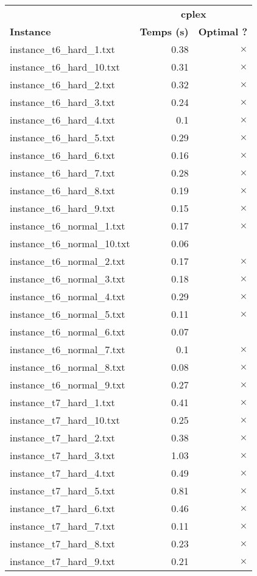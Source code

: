 \documentclass{article}
\begin{document}
\newpage
\begin{center}
\renewcommand{\arraystretch}{1.4} 
\begin{tabular}{lrr}
	\hline
 & \multicolumn{2}{c}{\textbf{cplex}}\\
\textbf{Instance}  & \textbf{Temps (s)} & \textbf{Optimal ?} \\\hline

instance\_t6\_hard\_1.txt & 0.38 & 
$\times$
\\
instance\_t6\_hard\_10.txt & 0.31 & 
$\times$
\\
instance\_t6\_hard\_2.txt & 0.32 & 
$\times$
\\
instance\_t6\_hard\_3.txt & 0.24 & 
$\times$
\\
instance\_t6\_hard\_4.txt & 0.1 & 
$\times$
\\
instance\_t6\_hard\_5.txt & 0.29 & 
$\times$
\\
instance\_t6\_hard\_6.txt & 0.16 & 
$\times$
\\
instance\_t6\_hard\_7.txt & 0.28 & 
$\times$
\\
instance\_t6\_hard\_8.txt & 0.19 & 
$\times$
\\
instance\_t6\_hard\_9.txt & 0.15 & 
$\times$
\\
instance\_t6\_normal\_1.txt & 0.17 & 
$\times$
\\
instance\_t6\_normal\_10.txt & 0.06 & 
\\
instance\_t6\_normal\_2.txt & 0.17 & 
$\times$
\\
instance\_t6\_normal\_3.txt & 0.18 & 
$\times$
\\
instance\_t6\_normal\_4.txt & 0.29 & 
$\times$
\\
instance\_t6\_normal\_5.txt & 0.11 & 
$\times$
\\
instance\_t6\_normal\_6.txt & 0.07 & 
\\
instance\_t6\_normal\_7.txt & 0.1 & 
$\times$
\\
instance\_t6\_normal\_8.txt & 0.08 & 
$\times$
\\
instance\_t6\_normal\_9.txt & 0.27 & 
$\times$
\\
instance\_t7\_hard\_1.txt & 0.41 & 
$\times$
\\
instance\_t7\_hard\_10.txt & 0.25 & 
$\times$
\\
instance\_t7\_hard\_2.txt & 0.38 & 
$\times$
\\
instance\_t7\_hard\_3.txt & 1.03 & 
$\times$
\\
instance\_t7\_hard\_4.txt & 0.49 & 
$\times$
\\
instance\_t7\_hard\_5.txt & 0.81 & 
$\times$
\\
instance\_t7\_hard\_6.txt & 0.46 & 
$\times$
\\
instance\_t7\_hard\_7.txt & 0.11 & 
$\times$
\\
instance\_t7\_hard\_8.txt & 0.23 & 
$\times$
\\
instance\_t7\_hard\_9.txt & 0.21 & 
$\times$
\\
\hline\end{tabular}
\end{center}
\end{document}
